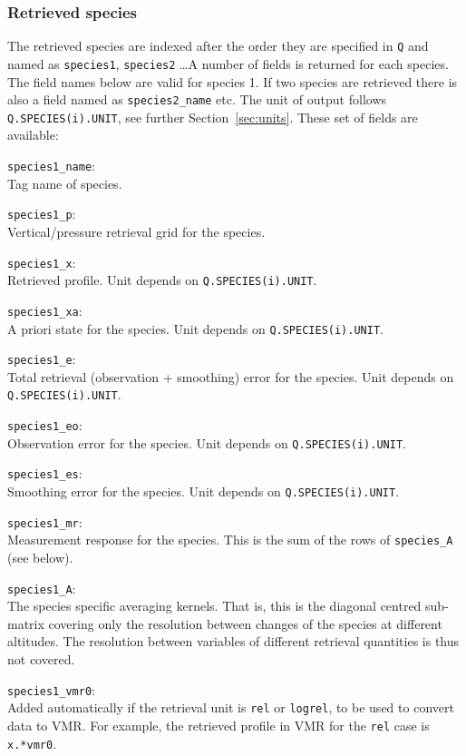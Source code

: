 \documentclass[a4paper,11pt]{article}
\newcommand{\newfield}{\vspace{1ex}\noindent}
\begin{document}
\subsubsection{Retrieved species}
%
The retrieved species are indexed after the order they are specified in
\verb|Q| and named as \verb|species1|, \verb|species2| \dots A number of fields
is returned for each species. The field names below are valid for species 1. If
two species are retrieved there is also a field named as \verb|species2_name|
etc. The unit of output follows \verb|Q.SPECIES(i).UNIT|, see further
Section~\ref{sec:units}. These set of fields are available:

\newfield 
\verb|species1_name|:\\
Tag name of species.

\newfield 
\verb|species1_p|:\\
Vertical/pressure retrieval grid for the species.

\newfield 
\verb|species1_x|:\\
Retrieved profile. Unit depends on \verb|Q.SPECIES(i).UNIT|.

\newfield 
\verb|species1_xa|:\\
A priori state for the species. Unit depends on \verb|Q.SPECIES(i).UNIT|.

\newfield 
\verb|species1_e|:\\
Total retrieval (observation + smoothing) error for the species. Unit depends on \verb|Q.SPECIES(i).UNIT|.

\newfield 
\verb|species1_eo|:\\
Observation error for the species. Unit depends on \verb|Q.SPECIES(i).UNIT|.

\newfield 
\verb|species1_es|:\\
Smoothing error for the species. Unit depends on \verb|Q.SPECIES(i).UNIT|.

\newfield
\verb|species1_mr|:\\
Measurement response for the species. This is the sum of the rows of
\verb|species_A| (see below).

\newfield
\verb|species1_A|:\\
The species specific averaging kernels. That is, this is the diagonal
centred sub-matrix covering only the resolution between changes of the
species at different altitudes. The resolution between variables of
different retrieval quantities is thus not covered.

\newfield
\verb|species1_vmr0|:\\
Added automatically if the retrieval unit is \verb|rel| or \verb|logrel|, to be
used to convert data to VMR. For example, the retrieved profile in VMR for the
\verb|rel| case is \verb|x.*vmr0|.
\end{document}
